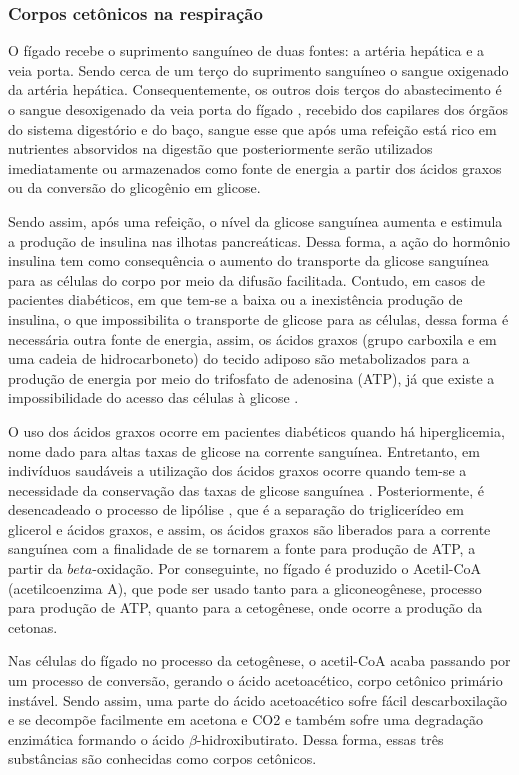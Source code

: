 \subsubsection{Corpos cetônicos na respiração}
O fígado recebe o suprimento sanguíneo de duas fontes: a artéria hepática e a veia porta. Sendo cerca de um terço do suprimento sanguíneo o sangue oxigenado da artéria hepática. Consequentemente, os outros dois terços do abastecimento é o sangue desoxigenado da veia porta do fígado \cite{Leungchavaphongse}, recebido dos capilares dos órgãos do sistema digestório e do baço, sangue esse que após uma refeição está rico em nutrientes absorvidos na digestão que posteriormente serão utilizados imediatamente ou armazenados  como fonte de energia a partir dos ácidos graxos ou da conversão do glicogênio em glicose. 

Sendo assim, após uma refeição, o nível da glicose sanguínea aumenta e estimula a produção de insulina nas ilhotas pancreáticas. Dessa forma, a ação do hormônio insulina tem como consequência o aumento do transporte da glicose sanguínea para as células do corpo por meio da difusão facilitada. Contudo, em casos de pacientes diabéticos, em que tem-se a baixa ou a inexistência produção de insulina, o que impossibilita o transporte de glicose para as células, dessa forma é necessária outra fonte de energia, assim, os ácidos graxos (grupo carboxila e em uma cadeia de hidrocarboneto) do tecido adiposo são metabolizados para a produção de energia por meio do trifosfato de adenosina (ATP), já que existe a impossibilidade do acesso das células à glicose \cite{Tortora}. 

O uso dos ácidos graxos ocorre em pacientes diabéticos quando há hiperglicemia, nome dado para altas taxas de glicose na corrente sanguínea. Entretanto, em indivíduos saudáveis a utilização dos ácidos graxos ocorre quando tem-se a necessidade da conservação das taxas de glicose sanguínea \cite{Tortora}. Posteriormente, é desencadeado o processo de lipólise \cite{Stanfield2014}, que é a separação do triglicerídeo em glicerol e ácidos graxos, e assim, os ácidos graxos são liberados para a corrente sanguínea com a finalidade de se tornarem a fonte para produção de ATP, a partir da $beta$-oxidação. Por conseguinte, no fígado é produzido o Acetil-CoA (acetilcoenzima A), que pode ser usado tanto para a gliconeogênese, processo para produção de ATP, quanto para a cetogênese, onde ocorre a produção da cetonas.

 Nas células do fígado no processo da cetogênese, o acetil-CoA acaba passando por um processo de conversão, gerando o ácido acetoacético, corpo cetônico primário instável. Sendo assim, uma parte do ácido acetoacético sofre fácil descarboxilação e se decompõe facilmente em acetona e CO2 \cite{Wang2013} e  também sofre uma degradação enzimática formando o ácido $\beta$-hidroxibutirato. Dessa forma, essas três substâncias são conhecidas como corpos cetônicos.
 
